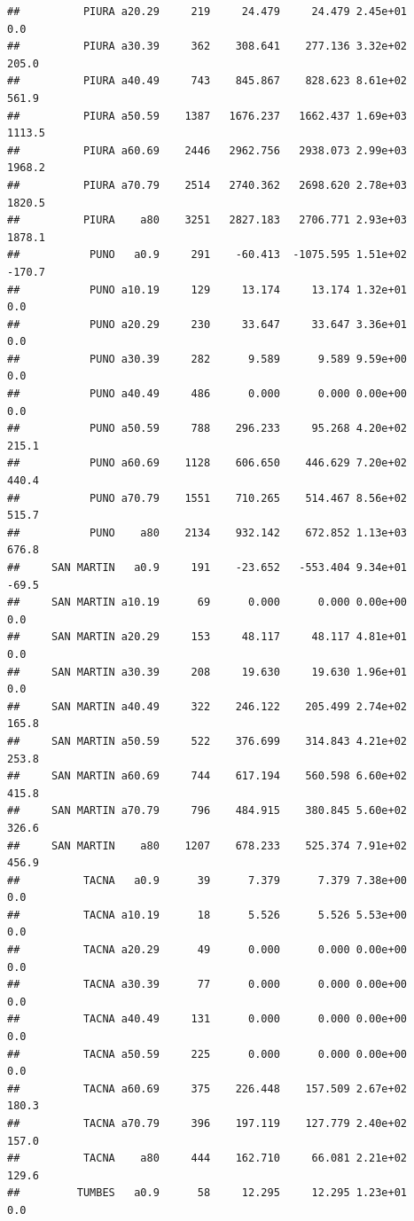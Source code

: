 \documentclass[
]{article}
\begin{document}
\begin{verbatim}
##          PIURA a20.29     219     24.479     24.479 2.45e+01        0.0
##          PIURA a30.39     362    308.641    277.136 3.32e+02      205.0
##          PIURA a40.49     743    845.867    828.623 8.61e+02      561.9
##          PIURA a50.59    1387   1676.237   1662.437 1.69e+03     1113.5
##          PIURA a60.69    2446   2962.756   2938.073 2.99e+03     1968.2
##          PIURA a70.79    2514   2740.362   2698.620 2.78e+03     1820.5
##          PIURA    a80    3251   2827.183   2706.771 2.93e+03     1878.1
##           PUNO   a0.9     291    -60.413  -1075.595 1.51e+02     -170.7
##           PUNO a10.19     129     13.174     13.174 1.32e+01        0.0
##           PUNO a20.29     230     33.647     33.647 3.36e+01        0.0
##           PUNO a30.39     282      9.589      9.589 9.59e+00        0.0
##           PUNO a40.49     486      0.000      0.000 0.00e+00        0.0
##           PUNO a50.59     788    296.233     95.268 4.20e+02      215.1
##           PUNO a60.69    1128    606.650    446.629 7.20e+02      440.4
##           PUNO a70.79    1551    710.265    514.467 8.56e+02      515.7
##           PUNO    a80    2134    932.142    672.852 1.13e+03      676.8
##     SAN MARTIN   a0.9     191    -23.652   -553.404 9.34e+01      -69.5
##     SAN MARTIN a10.19      69      0.000      0.000 0.00e+00        0.0
##     SAN MARTIN a20.29     153     48.117     48.117 4.81e+01        0.0
##     SAN MARTIN a30.39     208     19.630     19.630 1.96e+01        0.0
##     SAN MARTIN a40.49     322    246.122    205.499 2.74e+02      165.8
##     SAN MARTIN a50.59     522    376.699    314.843 4.21e+02      253.8
##     SAN MARTIN a60.69     744    617.194    560.598 6.60e+02      415.8
##     SAN MARTIN a70.79     796    484.915    380.845 5.60e+02      326.6
##     SAN MARTIN    a80    1207    678.233    525.374 7.91e+02      456.9
##          TACNA   a0.9      39      7.379      7.379 7.38e+00        0.0
##          TACNA a10.19      18      5.526      5.526 5.53e+00        0.0
##          TACNA a20.29      49      0.000      0.000 0.00e+00        0.0
##          TACNA a30.39      77      0.000      0.000 0.00e+00        0.0
##          TACNA a40.49     131      0.000      0.000 0.00e+00        0.0
##          TACNA a50.59     225      0.000      0.000 0.00e+00        0.0
##          TACNA a60.69     375    226.448    157.509 2.67e+02      180.3
##          TACNA a70.79     396    197.119    127.779 2.40e+02      157.0
##          TACNA    a80     444    162.710     66.081 2.21e+02      129.6
##         TUMBES   a0.9      58     12.295     12.295 1.23e+01        0.0

\end{verbatim}
\end{document}
